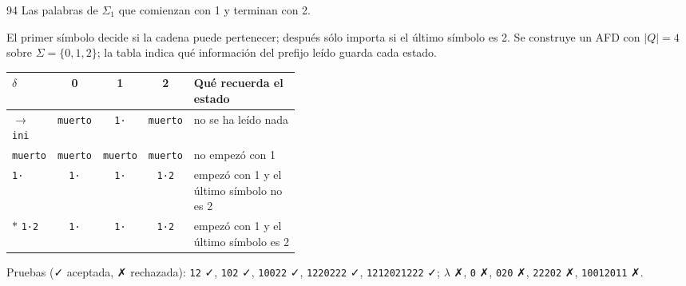 \documentclass[11pt]{article}
\begin{document}
\begin{ejercicio}{94}{}
Las palabras de $\Sigma_1$ que comienzan con 1 y terminan con 2.
\end{ejercicio}
\proc El primer símbolo decide si la cadena puede pertenecer; después sólo importa si el último símbolo es 2. Se construye un AFD con $|Q| = 4$ sobre $\Sigma = \{0, 1, 2\}$; la tabla indica qué información del prefijo leído guarda cada estado.
\begin{center}\small\begin{tabular}{lcccp{0.42\linewidth}}\toprule
$\delta$ & 0 & 1 & 2 & Qué recuerda el estado \\\midrule
$\to$ \texttt{ini} & \texttt{muerto} & \texttt{1·} & \texttt{muerto} & no se ha leído nada \\
 \texttt{muerto} & \texttt{muerto} & \texttt{muerto} & \texttt{muerto} & no empezó con 1 \\
 \texttt{1·} & \texttt{1·} & \texttt{1·} & \texttt{1·2} & empezó con 1 y el último símbolo no es 2 \\
$*$ \texttt{1·2} & \texttt{1·} & \texttt{1·} & \texttt{1·2} & empezó con 1 y el último símbolo es 2 \\
\bottomrule\end{tabular}\end{center}
Pruebas (✓ aceptada, ✗ rechazada): \texttt{12} ✓, \texttt{102} ✓, \texttt{10022} ✓, \texttt{1220222} ✓, \texttt{1212021222} ✓; $\lambda$ ✗, \texttt{0} ✗, \texttt{020} ✗, \texttt{22202} ✗, \texttt{10012011} ✗.
\end{document}
